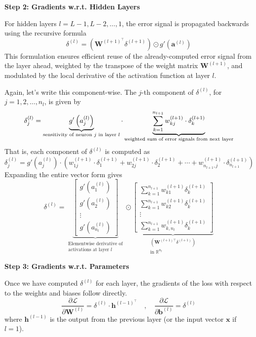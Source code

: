 \textbf{Step 2: Gradients w.r.t. Hidden Layers}

For hidden layers \( l = L-1, L-2, \dots, 1 \), the error signal is propagated backwards using the recursive formula
\[
\delta^{(l)} = \left( \mathbf{W}^{(l+1)^\top} \delta^{(l+1)} \right) \odot g'(\mathbf{a}^{(l)})
\]
This formulation ensures efficient reuse of the already-computed error signal from the layer ahead, weighted by the transpose of the weight matrix \( \mathbf{W}^{(l+1)} \), and modulated by the local derivative of the activation function at layer \( l \).

Again, let's write this component-wise. The \( j \)-th component of \( \delta^{(l)} \), for \( j = 1, 2, \dots, n_l \), is given by 
\[
\delta_j^{(l)} = 
\underbrace{
g'\left( a_j^{(l)} \right)
}_{\text{\scriptsize sensitivity of neuron } j \text{ in layer } l}
\cdot
\underbrace{
\sum_{k=1}^{n_{l+1}} w_{kj}^{(l+1)} \cdot \delta_k^{(l+1)}
}_{\text{\scriptsize weighted sum of error signals from next layer}}
\]
That is, each component of \( \delta^{(l)} \) is computed as
\[
\delta_j^{(l)} = 
g'\left( a_j^{(l)} \right) \cdot 
\left(
w_{1j}^{(l+1)} \cdot \delta_1^{(l+1)} +
w_{2j}^{(l+1)} \cdot \delta_2^{(l+1)} +
\cdots +
w_{n_{l+1},j}^{(l+1)} \cdot \delta_{n_{l+1}}^{(l+1)}
\right)
\]
Expanding the entire vector form gives 
\[
\delta^{(l)} = 
\underbrace{
\begin{bmatrix}
g'\left( a_1^{(l)} \right) \\
g'\left( a_2^{(l)} \right) \\
\vdots \\
g'\left( a_{n_l}^{(l)} \right)
\end{bmatrix}
}_{\substack{\text{Elementwise derivative of} \\ \text{activations at layer } l}}
\odot
\underbrace{
\begin{bmatrix}
\sum\limits_{k=1}^{n_{l+1}} w_{k1}^{(l+1)} \delta_k^{(l+1)} \\
\sum\limits_{k=1}^{n_{l+1}} w_{k2}^{(l+1)} \delta_k^{(l+1)} \\
\vdots \\
\sum\limits_{k=1}^{n_{l+1}} w_{k,n_l}^{(l+1)} \delta_k^{(l+1)}
\end{bmatrix}
}_{\substack{\left( \mathbf{W}^{(l+1)\top} \delta^{(l+1)} \right) \\ \text{in } \mathbb{R}^{n_l}}}
\]

\textbf{Step 3: Gradients w.r.t. Parameters}

Once we have computed \( \delta^{(l)} \) for each layer, the gradients of the loss with respect to the weights and biases follow directly.
\[
\frac{\partial \mathcal{L}}{\partial \mathbf{W}^{(l)}} = \delta^{(l)} \cdot \mathbf{h}^{(l-1)^\top}
\quad , \quad
\frac{\partial \mathcal{L}}{\partial \mathbf{b}^{(l)}} = \delta^{(l)}
\]
where \( \mathbf{h}^{(l-1)} \) is the output from the previous layer (or the input vector \( \mathbf{x} \) if \( l=1 \)).

